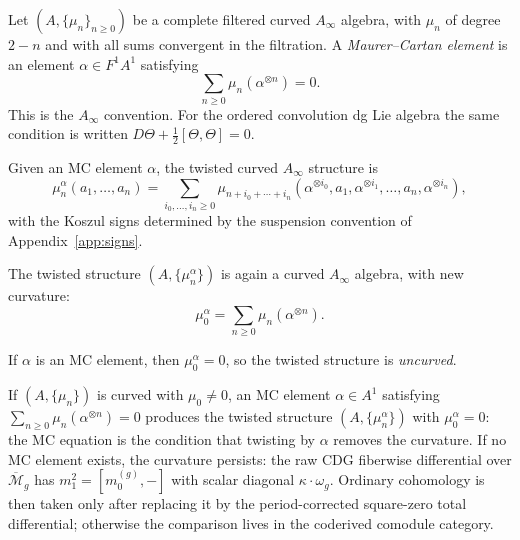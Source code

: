 \begin{definition}
\label{def:mc-element-curved}
\label{ex:maurer-cartan}
Let $(A,\{\mu_n\}_{n\geq0})$ be a complete filtered curved
$A_\infty$ algebra, with $\mu_n$ of degree $2-n$ and with all sums
convergent in the filtration. A \emph{Maurer--Cartan element} is an
element $\alpha\in F^1A^1$ satisfying
\begin{equation}
\label{eq:mc-equation}
\sum_{n \geq 0}\mu_n(\alpha^{\otimes n})=0.
\end{equation}
This is the $A_\infty$ convention. For the ordered convolution dg Lie
algebra the same condition is written
$D\Theta+\tfrac12[\Theta,\Theta]=0$.
\end{definition}

\begin{theorem}
\label{thm:twisting-mc}
\label{ex:mc-deformations}
Given an MC element $\alpha$, the twisted curved $A_\infty$ structure is
\begin{equation}
\mu_n^\alpha(a_1,\ldots,a_n)
=
\sum_{i_0,\ldots,i_n\geq0}
\mu_{n+i_0+\cdots+i_n}
(\alpha^{\otimes i_0},a_1,\alpha^{\otimes i_1},
\ldots,a_n,\alpha^{\otimes i_n}),
\end{equation}
with the Koszul signs determined by the suspension convention of
Appendix~\ref{app:signs}.

The twisted structure $(A, \{\mu_n^\alpha\})$ is again a curved $A_\infty$ algebra, with new
curvature:
\begin{equation}
\mu_0^\alpha=\sum_{n\geq0}\mu_n(\alpha^{\otimes n}).
\end{equation}

If $\alpha$ is an MC element, then $\mu_0^\alpha = 0$, so the twisted structure is
\emph{uncurved}.
\end{theorem}

\begin{remark}
\label{rem:mc-uncurving}
If $(A, \{\mu_n\})$ is curved with $\mu_0 \neq 0$, an MC element
$\alpha \in A^1$ satisfying $\sum_{n \geq 0} \mu_n(\alpha^{\otimes n}) = 0$
produces the twisted structure $(A, \{\mu_n^\alpha\})$ with $\mu_0^\alpha = 0$:
the MC equation is the condition that twisting by $\alpha$ removes the curvature.
If no MC element exists, the curvature persists: the raw CDG
fiberwise differential over $\overline{\mathcal{M}}_g$ has
$m_1^2=[m_0^{(g)},-]$ with scalar diagonal
$\kappa\cdot\omega_g$. Ordinary
cohomology is then taken only after replacing it by the
period-corrected square-zero total differential; otherwise the
comparison lives in the coderived comodule category.
\end{remark}

